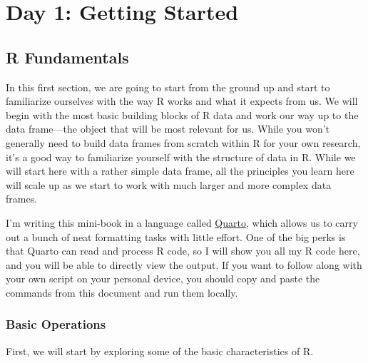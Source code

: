 \documentclass[
  letterpaper,
  DIV=11,
  numbers=noendperiod]{scrreprt}
\begin{document}
\part{Day 1: Getting Started}

\chapter{R Fundamentals}\label{r-fundamentals}

In this first section, we are going to start from the ground up and
start to familiarize ourselves with the way R works and what it expects
from us. We will begin with the most basic building blocks of R data and
work our way up to the data frame---the object that will be most
relevant for us. While you won't generally need to build data frames
from scratch within R for your own research, it's a good way to
familiarize yourself with the structure of data in R. While we will
start here with a rather simple data frame, all the principles you learn
here will scale up as we start to work with much larger and more complex
data frames.

\begin{tcolorbox}[enhanced jigsaw, colframe=quarto-callout-note-color-frame, arc=.35mm, coltitle=black, breakable, rightrule=.15mm, left=2mm, opacitybacktitle=0.6, colbacktitle=quarto-callout-note-color!10!white, toptitle=1mm, bottomtitle=1mm, titlerule=0mm, leftrule=.75mm, colback=white, title=\textcolor{quarto-callout-note-color}{\faInfo}\hspace{0.5em}{Note}, opacityback=0, bottomrule=.15mm, toprule=.15mm]

I'm writing this mini-book in a language called
\href{https://quarto.org/}{Quarto}, which allows us to carry out a bunch
of neat formatting tasks with little effort. One of the big perks is
that Quarto can read and process R code, so I will show you all my R
code here, and you will be able to directly view the output. If you want
to follow along with your own script on your personal device, you should
copy and paste the commands from this document and run them locally.

\end{tcolorbox}

\section{Basic Operations}\label{basic-operations}

First, we will start by exploring some of the basic characteristics of
R.
\end{document}

